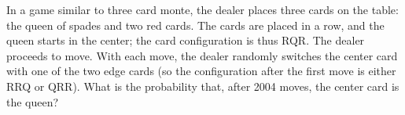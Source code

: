In a game similar to three card monte, the dealer places three cards on the table: the queen of spades and two red cards. The cards are placed in a row, and the queen starts in the center; the card configuration is thus RQR. The dealer proceeds to move. With each move, the dealer randomly switches the center card with one of the two edge cards (so the configuration after the first move is either RRQ or QRR). What is the probability that, after 2004 moves, the center card is the queen?
